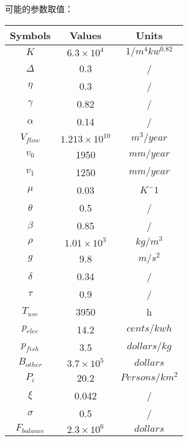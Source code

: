 \documentclass[nocover]{cumcmart}
\begin{document}
可能的参数取值：
\begin{table}[!ht]
\centering
  \begin{tabular}{ccc}
  \hline
  Symbols & Values & Units \\
  \hline
  $K$ & $6.3\times10^4$ & $1/m^{4}kw^{0.82}$ \\
  $\Delta$ & 0.3 & / \\
  $\eta$ & 0.3 & / \\
  $\gamma$ & 0.82 & / \\
  $\alpha$ & 0.14 & / \\
  $V_{flow}$ & $1.213\times10^{10}$ & $m^3/year$ \\
  $v_0$ & 1950 & $mm/year$\\
  $v_1$ & 1250  & $mm/year$\\
  $\mu$ & 0.03 & $K^-1$\\
  $\theta$ & 0.5 & / \\
  $\beta$ & 0.85 & / \\
  $\rho$ & $1.01\times10^3$ & $kg/m^3$\\
  $g$ & 9.8 & $m/s^2$\\
  $\delta$ & 0.34 & / \\
  $\tau$ & 0.9 & / \\
  $T_{use}$ & 3950 & h \\
  $p_{elec}$ & 14.2 & $cents/kwh$ \\
  $p_{fish}$ & 3.5 & $dollars/kg$ \\
  $B_{other}$ & $3.7\times10^5$ & $dollars$ \\
  $P_{i}$ & 20.2 & $Persons/km^2$\\
  $\xi$ & 0.042 & / \\
  $\sigma$ & 0.5 & / \\
  $F_{balance}$ & $2.3\times10^6$ & $dollars$ \\
  \hline
  \end{tabular}
\end{table}
\end{document}
